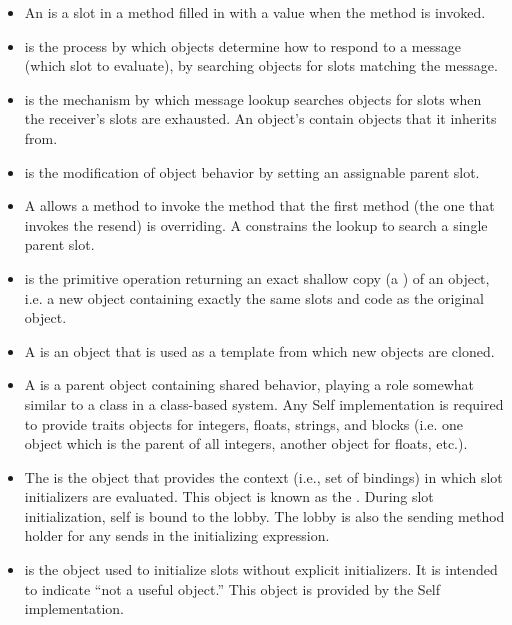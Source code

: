 \documentclass[letterpaper,10pt,english]{sphinxmanual}
\begin{document}
\begin{itemize}
\item {} 
An  is a slot in a method filled in with a value when the method is invoked.

\item {} 
 is the process by which objects determine how to respond to a message (which slot to evaluate), by searching objects for slots matching the message.

\item {} 
 is the mechanism by which message lookup searches objects for slots when the receiver’s slots are exhausted. An object’s  contain objects that it inherits from.

\item {} 
 is the modification of object behavior by setting an assignable parent slot.

\item {} 
A  allows a method to invoke the method that the first method (the one that invokes the resend) is overriding. A  constrains the lookup to search a single parent slot.

\item {} 
 is the primitive operation returning an exact shallow copy (a ) of an object, i.e. a new object containing exactly the same slots and code as the original object.

\item {} 
A  is an object that is used as a template from which new objects are cloned.

\item {} 
A  is a parent object containing shared behavior, playing a role somewhat similar to a class in a class-based system. Any Self implementation is required to provide traits objects for integers, floats, strings, and blocks (i.e. one object which is the parent of all integers, another object for floats, etc.).

\item {} 
The  is the object that provides the context (i.e., set of bindings) in which slot initializers are evaluated. This object is known as the . During slot initialization, self is bound to the lobby. The lobby is also the sending method holder for any sends in the initializing expression.

\item {} 
 is the object used to initialize slots without explicit initializers. It is intended to indicate “not a useful object.” This object is provided by the Self implementation.

\end{itemize}
\end{document}
